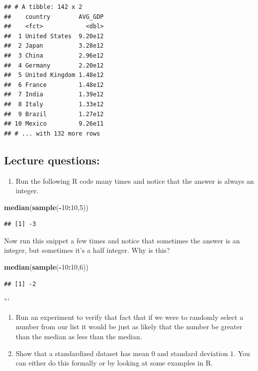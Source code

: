 \documentclass[]{book}
\newenvironment{Shaded}{\begin{snugshade}}{\end{snugshade}}
\newcommand{\DecValTok}[1]{\textcolor[rgb]{0.00,0.00,0.81}{#1}}
\newcommand{\KeywordTok}[1]{\textcolor[rgb]{0.13,0.29,0.53}{\textbf{#1}}}
\newcommand{\NormalTok}[1]{#1}
\newcommand{\OperatorTok}[1]{\textcolor[rgb]{0.81,0.36,0.00}{\textbf{#1}}}
\providecommand{\tightlist}{%
  \setlength{\itemsep}{0pt}\setlength{\parskip}{0pt}}
\begin{document}
\begin{verbatim}
## # A tibble: 142 x 2
##    country        AVG_GDP
##    <fct>            <dbl>
##  1 United States  9.20e12
##  2 Japan          3.28e12
##  3 China          2.96e12
##  4 Germany        2.20e12
##  5 United Kingdom 1.48e12
##  6 France         1.48e12
##  7 India          1.39e12
##  8 Italy          1.33e12
##  9 Brazil         1.27e12
## 10 Mexico         9.26e11
## # ... with 132 more rows
\end{verbatim}

\hypertarget{lecture-questions}{%
\subsection{Lecture questions:}\label{lecture-questions}}

\begin{enumerate}
\def\labelenumi{\arabic{enumi}.}
\tightlist
\item
  Run the following R code many times and notice that the answer is always an integer.
\end{enumerate}

\begin{Shaded}
\begin{Highlighting}[]
\KeywordTok{median}\NormalTok{(}\KeywordTok{sample}\NormalTok{(}\OperatorTok{-}\DecValTok{10}\OperatorTok{:}\DecValTok{10}\NormalTok{,}\DecValTok{5}\NormalTok{))}
\end{Highlighting}
\end{Shaded}

\begin{verbatim}
## [1] -3
\end{verbatim}

Now run this snippet a few times and notice that sometimes the answer is an integer, but sometimes it's a half integer. Why is this?

\begin{Shaded}
\begin{Highlighting}[]
\KeywordTok{median}\NormalTok{(}\KeywordTok{sample}\NormalTok{(}\OperatorTok{-}\DecValTok{10}\OperatorTok{:}\DecValTok{10}\NormalTok{,}\DecValTok{6}\NormalTok{))}
\end{Highlighting}
\end{Shaded}

\begin{verbatim}
## [1] -2
\end{verbatim}

```

\begin{enumerate}
\def\labelenumi{\arabic{enumi}.}
\setcounter{enumi}{1}
\item
  Run an experiment to verify that fact that if we were to randomly select a number from our list it would be just as likely that the number be greater than the median as less than the median.
\item
  Show that a standardized dataset has mean \(0\) and standard deviation \(1\). You can either do this formally or by looking at some examples in R.
\end{enumerate}
\end{document}
